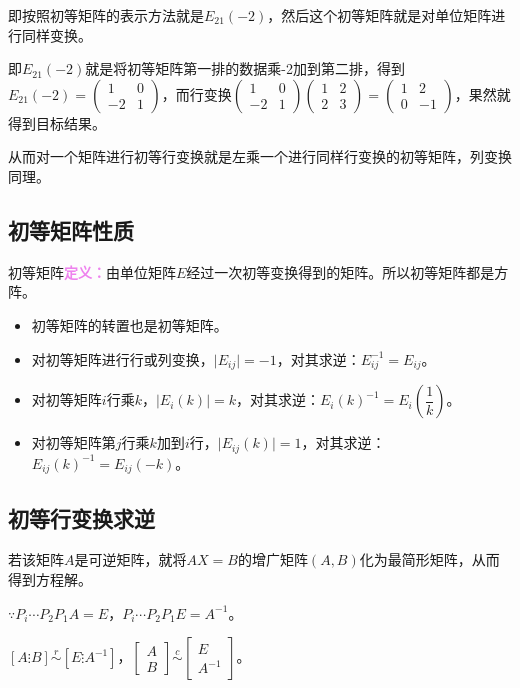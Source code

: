 \documentclass[UTF8, 12pt]{ctexart}
\begin{document}
即按照初等矩阵的表示方法就是$E_{21}(-2)$，然后这个初等矩阵就是对单位矩阵进行同样变换。

即$E_{21}(-2)$就是将初等矩阵第一排的数据乘-2加到第二排，得到$E_{21}(-2)=\left(\begin{array}{cc}
1 & 0 \\
-2 & 1
\end{array}\right)$，而行变换$\left(\begin{array}{cc}
1 & 0 \\
-2 & 1
\end{array}\right)\left(\begin{array}{cc}
1 & 2 \\
2 & 3
\end{array}\right)=\left(\begin{array}{cc}
1 & 2 \\
0 & -1
\end{array}\right)$，果然就得到目标结果。

从而对一个矩阵进行初等行变换就是左乘一个进行同样行变换的初等矩阵，列变换同理。

\subsection{初等矩阵性质}

初等矩阵\textcolor{violet}{\textbf{定义：}}由单位矩阵$E$经过一次初等变换得到的矩阵。所以初等矩阵都是方阵。

\begin{itemize}
\item 初等矩阵的转置也是初等矩阵。
\item 对初等矩阵进行行或列变换，$\vert E_{ij}\vert=-1$，对其求逆：$E_{ij}^{-1}=E_{ij}$。
\item 对初等矩阵$i$行乘$k$，$\vert E_i(k)\vert=k$，对其求逆：$E_i(k)^{-1}=E_i\left(\dfrac{1}{k}\right)$。
\item 对初等矩阵第$j$行乘$k$加到$i$行，$\vert E_{ij}(k)\vert=1$，对其求逆：$E_{ij}(k)^{-1}=E_{ij}(-k)$。
\end{itemize}

\subsection{初等行变换求逆}

若该矩阵$A$是可逆矩阵，就将$AX=B$的增广矩阵$(A,B)$化为最简形矩阵，从而得到方程解。\medskip

$\because P_i\cdots P_2P_1A=E$，$P_i\cdots P_2P_1E=A^{-1}$。

$\left[A\vdots B\right]\overset{r}{\sim}\left[E\vdots A^{-1}\right]$，$\left[\begin{array}{c}
A \\
B
\end{array}\right]\overset{c}{\sim}\left[\begin{array}{c}
E \\
A^{-1}
\end{array}\right]$。
\end{document}
